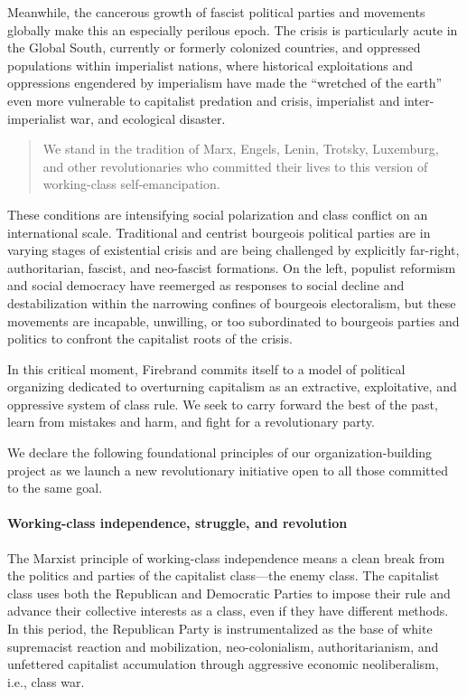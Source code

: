 Meanwhile, the cancerous growth of fascist political parties and movements globally make this an especially perilous epoch. The crisis is particularly acute in the Global South, currently or formerly colonized countries, and oppressed populations within imperialist nations, where historical exploitations and oppressions engendered by imperialism have made the ``wretched of the earth'' even more vulnerable to capitalist predation and crisis, imperialist and inter-imperialist war, and ecological disaster.

\blockquote{We stand in the tradition of Marx, Engels, Lenin, Trotsky, Luxemburg, and other revolutionaries who committed their lives to this version of working-class self-emancipation.}

These conditions are intensifying social polarization and class conflict on an international scale. Traditional and centrist bourgeois political parties are in varying stages of existential crisis and are being challenged by explicitly far-right, authoritarian, fascist, and neo-fascist formations. On the left, populist reformism and social democracy have reemerged as responses to social decline and destabilization within the narrowing confines of bourgeois electoralism, but these movements are incapable, unwilling, or too subordinated to bourgeois parties and politics to confront the capitalist roots of the crisis.

In this critical moment, Firebrand commits itself to a model of political organizing dedicated to overturning capitalism as an extractive, exploitative, and oppressive system of class rule. We seek to carry forward the best of the past, learn from mistakes and harm, and fight for a revolutionary party.

We declare the following foundational principles of our organization-building project as we launch a new revolutionary initiative open to all those committed to the same goal.

\paragraph{Working-class independence, struggle, and revolution}

The Marxist principle of working-class independence means a clean break from the politics and parties of the capitalist class---the enemy class. The capitalist class uses both the Republican and Democratic Parties to impose their rule and advance their collective interests as a class, even if they have different methods. In this period, the Republican Party is instrumentalized as the base of white supremacist reaction and mobilization, neo-colonialism, authoritarianism, and unfettered capitalist accumulation through aggressive economic neoliberalism, i.e., class war.

